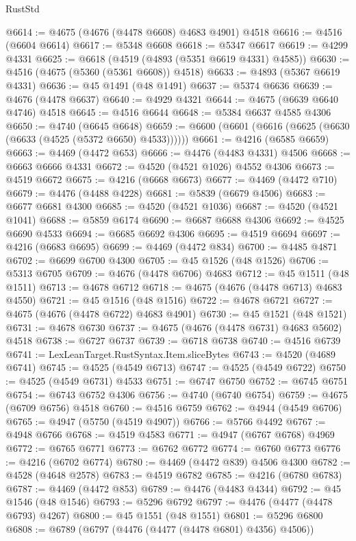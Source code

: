 \begin{lexlean}{RustStd}
\begin{coremodule}
{\begin{coremodule}
{{{{{{{{{{{{{{{{{{{{{{{{{{{{{{{{{{{{{{{{{{{{{{{{{{{{{{{{{{{{@6614 := @4675 (@4676 (@4478 @6608) @4683 @4901) @4518
@6616 := @4516 (@6604 @6614)
@6617 := @5348 @6608
@6618 := @5347 @6617
@6619 := @4299 @4331
@6625 := @6618 (@4519 (@4893 (@5351 @6619 @4331) @4585))
@6630 := @4516 (@4675 (@5360 (@5361 @6608)) @4518)
@6633 := @4893 (@5367 @6619 @4331)
@6636 := @45 @1491 (@48 @1491)
@6637 := @5374 @6636
@6639 := @4676 (@4478 @6637)
@6640 := @4929 @4321
@6644 := @4675 (@6639 @6640 @4746) @4518
@6645 := @4516 @6644
@6648 := @5384 @6637 @4585 @4306
@6650 := @4740 (@6645 @6648)
@6659 := @6600 (@6601 (@6616 (@6625 (@6630 (@6633 (@4525 (@5372 @6650) @4533))))))
@6661 := @4216 (@6585 @6659)
@6663 := @4469 (@4472 @653)
@6666 := @4476 (@4483 @4331) @4506
@6668 := @6663 @6666 @4331
@6672 := @4520 (@4521 @1026) @4552 @4306
@6673 := @4519 @6672
@6675 := @4216 (@6668 @6673)
@6677 := @4469 (@4472 @710)
@6679 := @4476 (@4488 @4228)
@6681 := @5839 (@6679 @4506)
@6683 := @6677 @6681 @4300
@6685 := @4520 (@4521 @1036)
@6687 := @4520 (@4521 @1041)
@6688 := @5859 @6174
@6690 := @6687 @6688 @4306
@6692 := @4525 @6690 @4533
@6694 := @6685 @6692 @4306
@6695 := @4519 @6694
@6697 := @4216 (@6683 @6695)
@6699 := @4469 (@4472 @834)
@6700 := @4485 @4871
@6702 := @6699 @6700 @4300
@6705 := @45 @1526 (@48 @1526)
@6706 := @5313 @6705
@6709 := @4676 (@4478 @6706) @4683
@6712 := @45 @1511 (@48 @1511)
@6713 := @4678 @6712
@6718 := @4675 (@4676 (@4478 @6713) @4683 @4550)
@6721 := @45 @1516 (@48 @1516)
@6722 := @4678 @6721
@6727 := @4675 (@4676 (@4478 @6722) @4683 @4901)
@6730 := @45 @1521 (@48 @1521)
@6731 := @4678 @6730
@6737 := @4675 (@4676 (@4478 @6731) @4683 @5602) @4518
@6738 := @6727 @6737
@6739 := @6718 @6738
@6740 := @4516 @6739
@6741 := LexLeanTarget.RustSyntax.Item.sliceBytes
@6743 := @4520 (@4689 @6741)
@6745 := @4525 (@4549 @6713)
@6747 := @4525 (@4549 @6722)
@6750 := @4525 (@4549 @6731) @4533
@6751 := @6747 @6750
@6752 := @6745 @6751
@6754 := @6743 @6752 @4306
@6756 := @4740 (@6740 @6754)
@6759 := @4675 (@6709 @6756) @4518
@6760 := @4516 @6759
@6762 := @4944 (@4549 @6706)
@6765 := @4947 (@5750 (@4519 @4907))
@6766 := @5766 @4492
@6767 := @4948 @6766
@6768 := @4519 @4583
@6771 := @4947 (@6767 @6768) @4969
@6772 := @6765 @6771
@6773 := @6762 @6772
@6774 := @6760 @6773
@6776 := @4216 (@6702 @6774)
@6780 := @4469 (@4472 @839) @4506 @4300
@6782 := @4528 (@4648 @2578)
@6783 := @4519 @6782
@6785 := @4216 (@6780 @6783)
@6787 := @4469 (@4472 @853)
@6789 := @4476 (@4483 @4344)
@6792 := @45 @1546 (@48 @1546)
@6793 := @5296 @6792
@6797 := @4476 (@4477 (@4478 @6793) @4267)
@6800 := @45 @1551 (@48 @1551)
@6801 := @5296 @6800
@6808 := @6789 (@6797 (@4476 (@4477 (@4478 @6801) @4356) @4506))
}}}}}}}}}}}}}}}}}}}}}}}}}}}}}}}}}}}}}}}}}}}}}}}}}}}}}}}}}}}}
\end{coremodule}}
\end{coremodule}
\end{lexlean}
